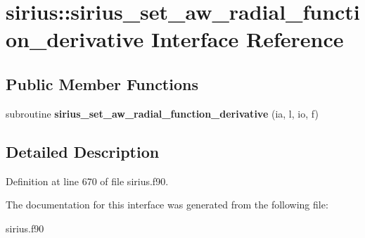 \hypertarget{interfacesirius_1_1sirius__set__aw__radial__function__derivative}{}\section{sirius\+:\+:sirius\+\_\+set\+\_\+aw\+\_\+radial\+\_\+function\+\_\+derivative Interface Reference}
\label{interfacesirius_1_1sirius__set__aw__radial__function__derivative}
\subsection*{Public Member Functions}
\begin{DoxyCompactItemize}
\item 
\hypertarget{interfacesirius_1_1sirius__set__aw__radial__function__derivative_ae6b85308c3ce03aa62d5c6980d1ee364}{}subroutine {\bfseries sirius\+\_\+set\+\_\+aw\+\_\+radial\+\_\+function\+\_\+derivative} (ia, l, io, f)\label{interfacesirius_1_1sirius__set__aw__radial__function__derivative_ae6b85308c3ce03aa62d5c6980d1ee364}

\end{DoxyCompactItemize}


\subsection{Detailed Description}


Definition at line 670 of file sirius.\+f90.



The documentation for this interface was generated from the following file\+:\begin{DoxyCompactItemize}
\item 
sirius.\+f90\end{DoxyCompactItemize}
